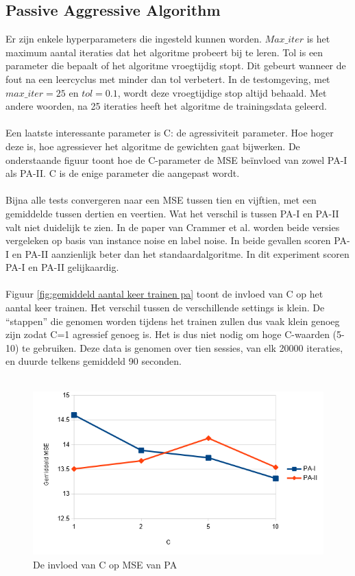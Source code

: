 \subsection{Passive Aggressive Algorithm}
Er zijn enkele hyperparameters die ingesteld kunnen worden. $Max\_ iter$ is het maximum aantal iteraties dat het algoritme probeert bij te leren. Tol is een parameter die bepaalt of het algoritme vroegtijdig stopt. Dit gebeurt wanneer de fout na een leercyclus met minder dan tol verbetert. In de testomgeving, met $max\_ iter=25$ en $tol=0.1$, wordt deze vroegtijdige stop altijd behaald. Met andere woorden, na 25 iteraties heeft het algoritme de trainingsdata geleerd.
\\\\
Een laatste interessante parameter is C: de agressiviteit parameter. Hoe hoger deze is, hoe agressiever het algoritme de gewichten gaat bijwerken. De onderstaande figuur toont hoe de C-parameter de MSE beïnvloed van zowel PA-I als PA-II. C is de enige parameter die aangepast wordt.
\\\\
Bijna alle tests convergeren naar een MSE tussen tien en vijftien, met een gemiddelde tussen dertien en veertien. Wat het verschil is tussen PA-I en PA-II valt niet duidelijk te zien. In de paper van Crammer et al. \cite{pa algorithm} worden beide versies vergeleken op basis van instance noise en label noise. In beide gevallen scoren PA-I en PA-II aanzienlijk beter dan het standaardalgoritme. In dit experiment scoren PA-I en PA-II gelijkaardig.
\\\\
Figuur \ref{fig:gemiddeld aantal keer trainen pa} toont de invloed van C op het aantal keer trainen. Het verschil tussen de verschillende settings is klein. De “stappen” die genomen worden tijdens het trainen zullen dus vaak klein genoeg zijn zodat C=1 agressief genoeg is. Het is dus niet nodig om hoge C-waarden (5-10) te gebruiken. Deze data is genomen over tien sessies, van elk 20000 iteraties, en duurde telkens gemiddeld 90 seconden. 
\\\\
\begin{figure}[h]
	\includegraphics[width=\linewidth]{images/evaluatie/gemiddeldmsepa.png}
	\caption{De invloed van C op MSE van PA}
	\label{fig:invloed C op PA}
\end{figure}
